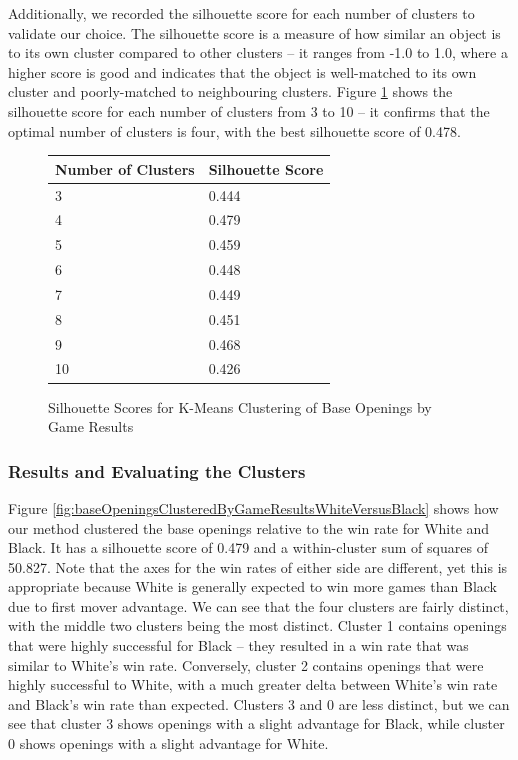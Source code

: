 \documentclass[a4paper, 11pt]{article}
\begin{document}
Additionally, we recorded the silhouette score for each number of clusters to validate our choice. The silhouette score is a measure of how similar an object is to its own cluster compared to other clusters -- it ranges from -1.0 to 1.0, where a higher score is good and indicates that the object is well-matched to its own cluster and poorly-matched to neighbouring clusters. Figure \ref{fig:silhouetteScoresForBaseOpeningsClusteredByGameResults} shows the silhouette score for each number of clusters from 3 to 10 -- it confirms that the optimal number of clusters is four, with the best silhouette score of 0.478.

\begin{figure}[H]
    \centering
    \caption{Silhouette Scores for K-Means Clustering of Base Openings by Game Results}
    \label{fig:silhouetteScoresForBaseOpeningsClusteredByGameResults}
    \begin{tabular}{| l | l |} 
        \hline
        \bf{Number of Clusters} & \bf{Silhouette Score} \\ [0.5ex] 
        \hline
        3 & 0.444 \\
        \hline
        4 & 0.479 \\
        \hline
        5 & 0.459 \\
        \hline
        6 & 0.448 \\
        \hline
        7 & 0.449 \\
        \hline
        8 & 0.451 \\
        \hline
        9 & 0.468 \\
        \hline
        10 & 0.426 \\
        \hline
    \end{tabular}
\end{figure}

\subsubsection{Results and Evaluating the Clusters}
Figure \ref{fig:baseOpeningsClusteredByGameResultsWhiteVersusBlack} shows how our method clustered the base openings relative to the win rate for White and Black. It has a silhouette score of 0.479 and a within-cluster sum of squares of 50.827. Note that the axes for the win rates of either side are different, yet this is appropriate because White is generally expected to win more games than Black due to first mover advantage. We can see that the four clusters are fairly distinct, with the middle two clusters being the most distinct. Cluster 1 contains openings that were highly successful for Black -- they resulted in a win rate that was similar to White's win rate. Conversely, cluster 2 contains openings that were highly successful to White, with a much greater delta between White's win rate and Black's win rate than expected. Clusters 3 and 0 are less distinct, but we can see that cluster 3 shows openings with a slight advantage for Black, while cluster 0 shows openings with a slight advantage for White.
\end{document}
